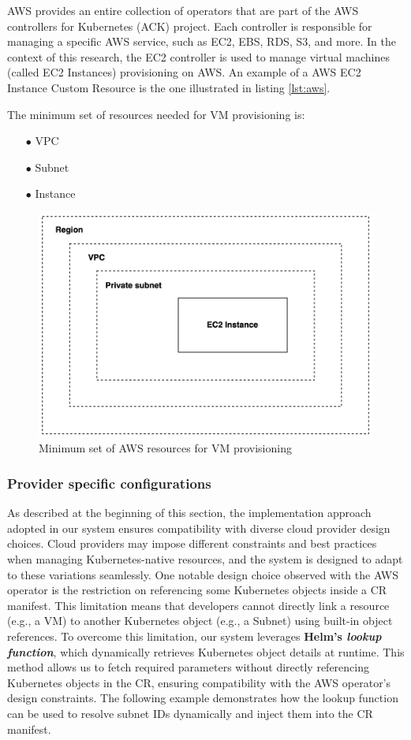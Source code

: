 AWS provides an entire collection of operators that are part of the AWS controllers for Kubernetes (ACK) project.
Each controller is responsible for managing a specific AWS service, such as EC2, EBS, RDS, S3, and more. In the context of this research, the EC2 controller is used to manage virtual machines (called EC2 Instances) provisioning on AWS.
An example of a AWS EC2 Instance Custom Resource is the one illustrated in listing \ref{lst:aws}.

\vspace{2cm}
The minimum set of resources needed for VM provisioning is:
\begin{itemize}[itemsep=0.2pt, topsep=1pt] 
\item[$\bullet$] VPC
\item[$\bullet$] Subnet
\item[$\bullet$] Instance
\end{itemize}

\begin{figure}[t]
\centering
\includegraphics[width=0.75\linewidth]{images/aws.png}
\caption{Minimum set of AWS resources for VM provisioning}
\label{fig:aws}
\end{figure}

\subsubsection{Provider specific configurations}

As described at the beginning of this section, the implementation approach adopted in our system ensures compatibility with diverse cloud provider design choices. Cloud providers may impose different constraints and best practices when managing Kubernetes-native resources, and the system is designed to adapt to these variations seamlessly.
One notable design choice observed with the AWS operator is the restriction on referencing some Kubernetes objects inside a CR manifest. 
This limitation means that developers cannot directly link a resource (e.g., a VM) to another Kubernetes object (e.g., a Subnet) using built-in object references.
To overcome this limitation, our system leverages \textbf{Helm’s \textit{lookup function}}, which dynamically retrieves Kubernetes object details at runtime. This method allows us to fetch required parameters without directly referencing Kubernetes objects in the CR, ensuring compatibility with the AWS operator’s design constraints. The following example demonstrates how the lookup function can be used to resolve subnet IDs dynamically and inject them into the CR manifest. \newline

